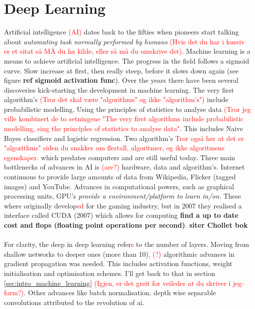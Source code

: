 \section{Deep Learning} \label{sec:intro_deep_learning}
Artificial intelligence \textcolor{red}{(AI)} dates back to the fifties when pioneers start talking about \textit{automating task normally performed by humans} \textcolor{red}{(Hvis det du har i kursiv er et sitat så MÅ du ha kilde, eller så må du omskrive det)}. Machine learning is a means to achieve artificial intelligence. The progress in the field follows a sigmoid curve. Slow increase at first, then really steep, before it slows down again (see figure \textbf{ref sigmoid activation func}). Over the years there have been several discoveries kick-starting the development in machine learning. The very first algorithm's \textcolor{red}{(Tror det skal være "algorithms" og ikke "algorithm's")} include probabilistic modelling. Using the principles of statistics to analyse data \textcolor{red}{(Tror jeg ville kombinert de to setningene "The very first algorithms include probabilistic modelling, sing the principles of statistics to analyse data"}. This includes Naive Bayes classifiers and logistic regression. Two algorithm's \textcolor{red}{Tror også her at det er "algorithms" siden du snakker om flertall, algoritmer, og ikke algoritmens egenskaper.} which predates computers and are still useful today. Three main bottlenecks of advances in AI is \textcolor{red}{(are?)} hardware, data and algorithm's. Internet continuous to provide large amounts of data from Wikipedia, Flicker (tagged images) and YouTube. Advances in computational powers, such as graphical processing units, GPU's \textit{provide a environment/platform to learn in/on}. These where originally develop\textcolor{red}{ed} for the gaming industry, but in 2007 they realised a interface called CUDA (2007) which allows for computing \textbf{find a up to date cost and flops (floating point operations per second)}. \textbf{siter Chollet bok}
\\ \\ 
For clarity, the deep in deep learning refer\textcolor{red}{s} to the number of layers. Moving from shallow networks to deeper ones (more than 10)\textcolor{red}{, (?)} algorithmic advances in gradient propagation was needed. This includes activation functions, weight initialisation and optimisation schemes. I'll get back to that in section \ref{sec:intro_machine_learning} \textcolor{red}{(Igjen, er det greit for veileder at du skriver i jeg-form?)}. Other advances like batch normalisation, depth wise separable convolutions attributed to the revolution of \acrshort{ai}. 
